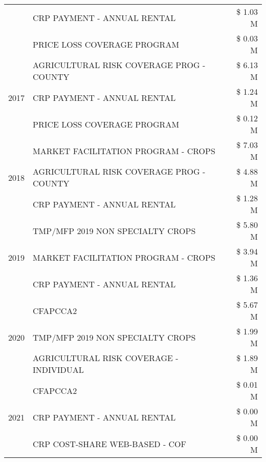 \begin{tabular}{llr}
 & CRP PAYMENT - ANNUAL RENTAL & \$ 1.03 M \\
 & PRICE LOSS COVERAGE PROGRAM & \$ 0.03 M \\
\cline{1-3}
\multirow[t]{3}{*}{2017} & AGRICULTURAL RISK COVERAGE PROG - COUNTY & \$ 6.13 M \\
 & CRP PAYMENT - ANNUAL RENTAL & \$ 1.24 M \\
 & PRICE LOSS COVERAGE PROGRAM & \$ 0.12 M \\
\cline{1-3}
\multirow[t]{3}{*}{2018} & MARKET FACILITATION PROGRAM - CROPS & \$ 7.03 M \\
 & AGRICULTURAL RISK COVERAGE PROG - COUNTY & \$ 4.88 M \\
 & CRP PAYMENT - ANNUAL RENTAL & \$ 1.28 M \\
\cline{1-3}
\multirow[t]{3}{*}{2019} & TMP/MFP 2019 NON SPECIALTY CROPS & \$ 5.80 M \\
 & MARKET FACILITATION PROGRAM - CROPS & \$ 3.94 M \\
 & CRP PAYMENT - ANNUAL RENTAL & \$ 1.36 M \\
\cline{1-3}
\multirow[t]{3}{*}{2020} & CFAPCCA2 & \$ 5.67 M \\
 & TMP/MFP 2019 NON SPECIALTY CROPS & \$ 1.99 M \\
 & AGRICULTURAL RISK COVERAGE - INDIVIDUAL & \$ 1.89 M \\
\cline{1-3}
\multirow[t]{3}{*}{2021} & CFAPCCA2 & \$ 0.01 M \\
 & CRP PAYMENT - ANNUAL RENTAL & \$ 0.00 M \\
 & CRP COST-SHARE WEB-BASED - COF & \$ 0.00 M \\
\cline{1-3}
\bottomrule
\end{tabular}
